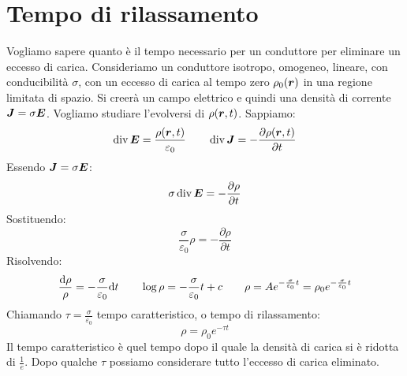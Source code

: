 \section{Tempo di rilassamento}
Vogliamo sapere quanto è il tempo necessario per un conduttore per eliminare un eccesso di carica. Consideriamo un conduttore isotropo, omogeneo, lineare, con conducibilità $\sigma$, con un eccesso di carica al tempo zero $\rho_0(\boldsymbol{r})$ in una regione limitata di spazio. Si creerà un campo elettrico e quindi una densità di corrente $\boldsymbol{J}=\sigma\boldsymbol{E}$. Vogliamo studiare l'evolversi di $\rho(\boldsymbol{r},t)$. Sappiamo:
\begin{equation*}\operatorname{div}\boldsymbol{E}=\frac{\rho(\boldsymbol{r},t)}{\varepsilon_0}\qquad\operatorname{div}\boldsymbol{J}=-\frac{\partial\rho(\boldsymbol{r},t)}{\partial t}\end{equation*}
Essendo $\boldsymbol{J}=\sigma\boldsymbol{E}$:
\begin{equation*}\sigma\operatorname{div}\boldsymbol{E}=-\frac{\partial\rho}{\partial t}\end{equation*}
Sostituendo:
\begin{equation*}\frac{\sigma}{\varepsilon_0}\rho=-\frac{\partial\rho}{\partial t}\end{equation*}
Risolvendo:
\begin{equation*}\frac{\mathrm{d}\rho}{\rho}=-\frac{\sigma}{\varepsilon_0}\mathrm{d} t\qquad \log\rho=-\frac{\sigma}{\varepsilon_0}t+c\qquad \rho=Ae^{-\frac{\sigma}{\varepsilon_0}t}=\rho_0 e^{-\frac{\sigma}{\varepsilon_0}t}\end{equation*}
Chiamando $\tau=\frac{\sigma}{\varepsilon_0}$ tempo caratteristico, o tempo di rilassamento:
\begin{equation*}\rho=\rho_0e^{-\tau t}\end{equation*}
Il tempo caratteristico  è quel tempo dopo il quale la densità di carica si è ridotta di $\frac{1}{e}$. Dopo qualche $\tau$ possiamo considerare tutto l'eccesso di carica eliminato.

